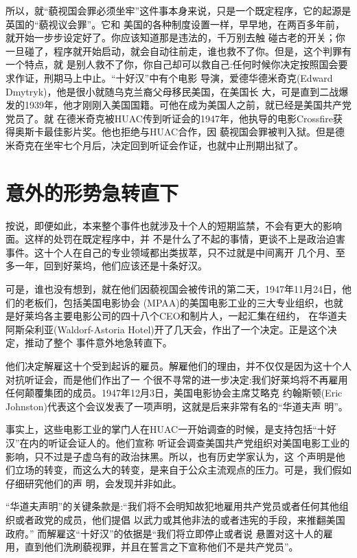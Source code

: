 \documentclass[10pt]{article}
\begin{document}
{所以，就``藐视国会罪必须坐牢''这件事本身来说，只是一个既定程序，它的起源是英国的``藐视议会罪''。它和
美国的各种制度设置一样，早早地，在两百多年前，就开始一步步设定好了。你应该知道那是违法的，千万别去触
碰古老的开关；你一旦碰了，程序就开始启动，就会自动往前走，谁也救不了你。但是，这个判罪有一个特点，就
是别人救不了你，你自己却可以救自己:任何时候你决定按照国会要求作证，刑期马上中止。``十好汉''中有个电影
导演，爱德华\textperiodcentered 德米奇克(Edward Dmytryk)，他是很小就随乌克兰裔父母移民美国，在美国长
大，可是直到二战爆发的1939年，他才刚刚入美国国籍。可他在成为美国人之前，就已经是美国共产党党员了。就
在德米奇克被HUAC传到听证会的1947年，他执导的电影Crossfire获得奥斯卡最佳影片奖。他也拒绝与HUAC合作，因
藐视国会罪被判入狱。但是德米奇克在坐牢七个月后，决定回到听证会作证，也就中止刑期出狱了。


\pagebreak
\section{意外的形势急转直下}

按说，即便如此，本来整个事件也就涉及十个人的短期监禁，不会有更大的影响面。这样的处罚在既定程序中，并
不是什么了不起的事情，更谈不上是政治迫害事件。这十个人在自己的专业领域都出类拔萃，只不过就是中间离开
几个月、至多一年，回到好莱坞，他们应该还是十条好汉。

可是，谁也没有想到，就在他们因藐视国会被传讯的第二天，1947年11月24日，他们的老板们，包括美国电影协会
(MPAA)的美国电影工业的三大专业组织，也就是好莱坞各主要电影公司的四十八个CEO和制片人，一起汇集在纽约，
在华道夫\myrule 阿斯朵利亚(Waldorf-Astoria Hotel)开了几天会，作出了一个决定。正是这个决定，推动了整个
事件意外地急转直下。

他们决定解雇这十个受到起诉的雇员。解雇他们的理由，并不仅仅是因为这十个人对抗听证会，而是他们作出了一
个很不寻常的进一步决定:我们好莱坞将不再雇用任何颠覆集团的成员。1947年12月3日，美国电影协会主席艾略克
\textperiodcentered 约翰斯顿(Eric Johnston)代表这个会议发表了一项声明，这就是后来非常有名的``华道夫声
明''。

事实上，这些电影工业的掌门人在HUAC一开始调查的时候，是支持包括``十好汉''在内的听证会证人的。他们宣称
听证会调查美国共产党组织对美国电影工业的影响，只不过是子虚乌有的政治抹黑。所以，也有历史学家认为，这
个声明是他们立场的转变，而这么大的转变，是来自于公众主流观点的压力。可是，我们假如仔细研究他们的声
明，会发现并非如此。

``华道夫声明''的关键条款是:``我们将不会明知故犯地雇用共产党员或者任何其他组织或者政党的成员，他们提倡
以武力或其他非法的或者违宪的手段，来推翻美国政府。'' 而解雇这``十好汉''的依据是``我们将立即停止或者说
悬置对这十人的雇用，直到他们洗刷藐视罪，并且在誓言之下宣称他们不是共产党员''。

}
\end{document}
